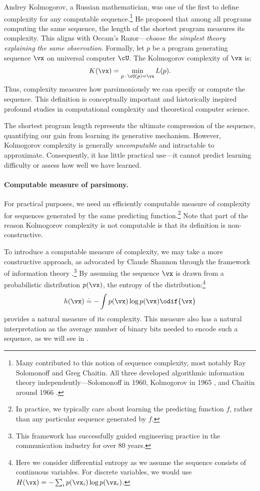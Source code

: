 \documentclass[../../book-main.tex]{subfiles}
\begin{document}
Andrey Kolmogorov, a Russian mathematician, was one of the first to
define complexity for any computable sequence.\footnote{Many
    contributed to this notion of sequence complexity, most notably Ray
    Solomonoff and Greg Chaitin. All three developed algorithmic
    information theory independently---Solomonoff in 1960, Kolmogorov in
    1965 \cite{Kolmogorov1998OnTO}, and Chaitin around 1966
\cite{Chaitin-1966}.} He proposed that among all programs computing
the same sequence, the length of the shortest program measures its
complexity. This aligns with Occam's Razor---\textit{choose the
simplest theory explaining the same observation}. Formally, let \(p\)
be a program generating sequence \(\vx\) on universal computer \(\cU\).
The Kolmogorov complexity of \(\vx\) is:
\begin{equation}
    K(\vx) = \min_{p\,:\, \cU(p) = \vx} L(p).
\end{equation}
Thus, complexity measures how parsimoniously we can specify or
compute the sequence. This definition is conceptually important and
historically inspired profound studies in computational complexity
and theoretical computer science.

The shortest program length represents the ultimate compression of
the sequence, quantifying our gain from learning its generative
mechanism. However, Kolmogorov complexity is generally {\em
uncomputable} \cite{Cover-Thomas} and intractable to approximate.
Consequently, it has little practical use---it cannot predict
learning difficulty or assess how well we have learned.

\paragraph{Computable measure of parsimony.}
For practical purposes, we need an efficiently computable measure of
complexity for sequences generated by the same predicting
function.\footnote{In practice, we typically care about learning the
    predicting function \(f\), rather than any particular sequence
generated by \(f\).} Note that part of the reason Kolmogorov
complexity is not computable is that its definition is non-constructive.

To introduce a computable measure of complexity, we may take a more
constructive approach, as advocated by Claude Shannon through the
framework of information theory
\cite{Shannon-1948,Cover-Thomas}.\footnote{This framework has
    successfully guided engineering practice in the communication
industry for over 80 years.} By assuming the sequence \(\vx\) is drawn
from a probabilistic distribution \(p(\vx)\), the entropy of the
distribution:\footnote{Here we consider differential entropy as we
    assume the sequence consists of continuous variables. For discrete
variables, we would use \(H(\vx) = - \sum_{i}p(\vx_{i}) \log p(\vx_{i})\).}
\begin{equation}
    h(\vx) \doteq -\int p(\vx) \log p(\vx) \odif{\vx}
    \label{eqn:entropy-definition}
\end{equation}
provides a natural measure of its complexity. This measure also has a
natural interpretation as the average number of binary bits needed to
encode such a sequence, as we will see in .
\end{document}
